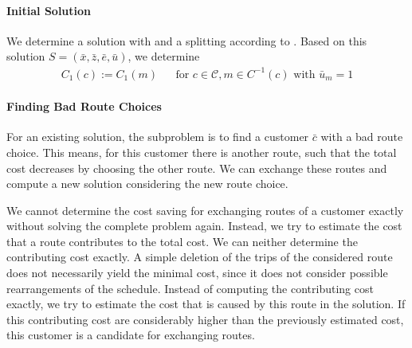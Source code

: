 \paragraph{Initial Solution} \parfill

We determine a solution with  and a splitting according to . Based on this solution $S=\left(\bar{x},\bar{z},\bar{e},\bar{u}\right)$, we determine 
\begin{align*}
	C_1(c) := C_1(m) && \text{for } c\in\mathcal{C}, m\in C^{-1}(c) \text{ with } \bar{u}_m = 1
\end{align*}

\paragraph{Finding Bad Route Choices} \parfill

For an existing solution, the subproblem is to find a customer $\bar{c}$ with a bad route choice. This means, for this customer there is another route, such that the total cost decreases by choosing the other route. We can exchange these routes and compute a new solution considering the new route choice. 

We cannot determine the cost saving for exchanging routes of a customer exactly without solving the complete problem again. Instead, we try to estimate the cost that a route contributes to the total cost. We can neither determine the contributing cost exactly. A simple deletion of the trips of the considered route does not necessarily yield the minimal cost, since it does not consider possible rearrangements of the schedule. Instead of computing the contributing cost exactly, we try to estimate the cost that is caused by this route in the solution. If this contributing cost are considerably higher than the previously estimated cost, this customer is a candidate for exchanging routes.

